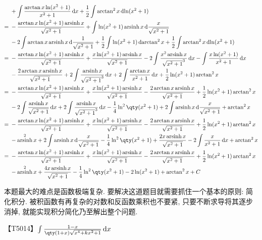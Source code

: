 \documentclass{ctexbook}
\DeclareMathOperator{\arsinh}{arsinh}
\newcommand*{\dif}{\mathop{}\!\mathrm{d}}
\begin{document}
{\begin{align*}
{}&+\int\frac{\arctan{x}\ln(x^{2}+1)}{x^{2}+1}\dif{x}+\frac{1}{2}\int\arctan^{2}{x}\dif{\ln(x^{2}+1)}\\
={}&-\frac{\arctan{x}\ln(x^{2}+1)\arsinh{x}}{\sqrt{x^{2}+1}}+\int\ln(x^{2}+1)\arsinh{x}\dif{\frac{x}{\sqrt{x^{2}+1}}}\\
{}&-2\int\arctan{x}\arsinh{x}\dif{\frac{1}{\sqrt{x^{2}+1}}}+\frac{1}{2}\int\ln(x^{2}+1)\dif{\arctan^{2}{x}}+\frac{1}{2}\int\arctan^{2}{x}\dif{\ln(x^{2}+1)}\\
={}&-\frac{\arctan{x}\ln(x^{2}+1)\arsinh{x}}{\sqrt{x^{2}+1}}+\frac{x\ln(x^{2}+1)\arsinh{x}}{\sqrt{x^{2}+1}}-2\int\frac{x^{2}\arsinh{x}}{\sqrt{x^{2}+1}^{3}}\dif{x}-\int\frac{x\ln(x^{2}+1)}{x^{2}+1}\dif{x}\\
{}&-\frac{2\arctan{x}\arsinh{x}}{\sqrt{x^{2}+1}}+2\int\frac{\arsinh{x}}{\sqrt{x^{2}+1}^{3}}\dif{x}+2\int\frac{\arctan{x}}{x^{2}+1}\dif{x}+\frac{1}{2}\ln(x^{2}+1)\arctan^{2}{x}\\
={}&-\frac{\arctan{x}\ln(x^{2}+1)\arsinh{x}}{\sqrt{x^{2}+1}}+\frac{x\ln(x^{2}+1)\arsinh{x}}{\sqrt{x^{2}+1}}-\frac{2\arctan{x}\arsinh{x}}{\sqrt{x^{2}+1}}+\frac{1}{2}\ln(x^{2}+1)\arctan^{2}{x}\\
{}&-2\int\frac{\arsinh{x}}{\sqrt{x^{2}+1}}\dif{x}+2\int\frac{\arsinh{x}}{\sqrt{x^{2}+1}^{3}}\dif{x}-\frac{1}{4}\ln^{2}\qty(x^{2}+1)+2\int\arsinh{x}\dif{\frac{x}{\sqrt{x^{2}+1}}}+\arctan^{2}{x}\\
={}&-\frac{\arctan{x}\ln(x^{2}+1)\arsinh{x}}{\sqrt{x^{2}+1}}+\frac{x\ln(x^{2}+1)\arsinh{x}}{\sqrt{x^{2}+1}}-\frac{2\arctan{x}\arsinh{x}}{\sqrt{x^{2}+1}}+\frac{1}{2}\ln(x^{2}+1)\arctan^{2}{x}\\
{}&-\arsinh^{2}{x}+2\int\arsinh{x}\dif{\frac{x}{\sqrt{x^{2}+1}}}-\frac{1}{4}\ln^{2}\qty(x^{2}+1)+\frac{2x\arsinh{x}}{\sqrt{x^{2}+1}}-2\int\frac{x}{x^{2}+1}\dif{x}+\arctan^{2}{x}\\
={}&-\frac{\arctan{x}\ln(x^{2}+1)\arsinh{x}}{\sqrt{x^{2}+1}}+\frac{x\ln(x^{2}+1)\arsinh{x}}{\sqrt{x^{2}+1}}-\frac{2\arctan{x}\arsinh{x}}{\sqrt{x^{2}+1}}+\frac{1}{2}\ln(x^{2}+1)\arctan^{2}{x}\\
{}&-\arsinh^{2}{x}+\frac{4x\arsinh{x}}{\sqrt{x^{2}+1}}-\frac{1}{4}\ln^{2}\qty(x^{2}+1)-2\ln(x^{2}+1)+\arctan^{2}{x}+C
\end{align*}\par
{\kaishu 本题最大的难点是函数极端复杂. 要解决这道题目就需要抓住一个基本的原则: 简化积分. 被积函数有再复杂的对数和反函数乘积也不要紧, 只要不断求导将其逐步消掉, 就能实现积分简化乃至解出整个问题. \par}
【T5014】$\int\frac{1-x}{\qty(1+x)\sqrt{x^{4}+kx^{2}+1}}\dif{x}$\par
}
\end{document}

